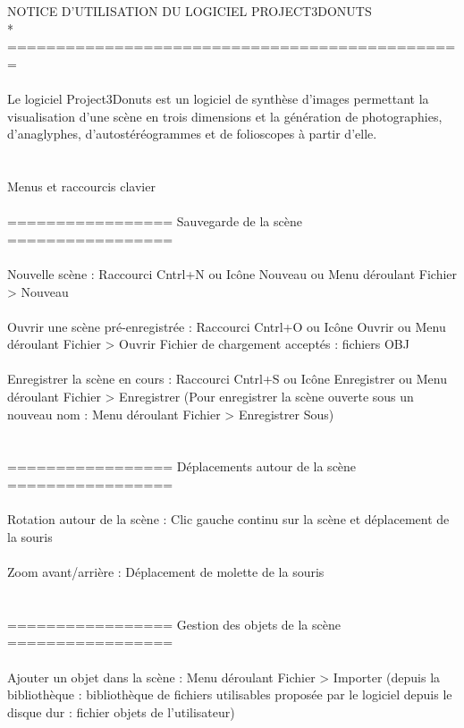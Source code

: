 NOTICE D'UTILISATION DU LOGICIEL PROJECT3DONUTS\\*
===============================================
\\ \\
Le logiciel Project3Donuts est un logiciel de synthèse d'images permettant la visualisation d'une scène en trois dimensions et la génération de photographies, d'anaglyphes, d'autostéréogrammes et de folioscopes à partir d'elle.
\\ \\ \\
Menus et raccourcis clavier
\\ \\
================= Sauvegarde de la scène =================
\\ \\
Nouvelle scène :			Raccourci Cntrl+N     
	       	 			ou     Icône Nouveau     
		 			ou     Menu déroulant Fichier > Nouveau
\\ \\
Ouvrir une scène pré-enregistrée : 	Raccourci Cntrl+O
       	   	 		   	ou      Icône Ouvrir
				   	ou	Menu déroulant Fichier > Ouvrir
		Fichier de chargement acceptés : fichiers OBJ
\\ \\
Enregistrer la scène en cours :       	Raccourci Cntrl+S
	       	     	      		ou 	Icône Enregistrer
					ou 	Menu déroulant Fichier > Enregistrer
		(Pour enregistrer la scène ouverte sous un nouveau nom : Menu déroulant Fichier > Enregistrer Sous)
\\ \\ \\
================= Déplacements autour de la scène =================
\\ \\
Rotation autour de la scène :  	        Clic gauche continu sur la scène et déplacement de la souris
\\ \\
Zoom avant/arrière :  	    		Déplacement de molette de la souris
\\ \\ \\
================= Gestion des objets de la scène =================
\\ \\
Ajouter un objet dans la scène : 	Menu déroulant Fichier > Importer
	   	      	       		     (depuis la bibliothèque : bibliothèque de fichiers utilisables proposée par le logiciel
					      depuis le disque dur   : fichier objets de l'utilisateur)
